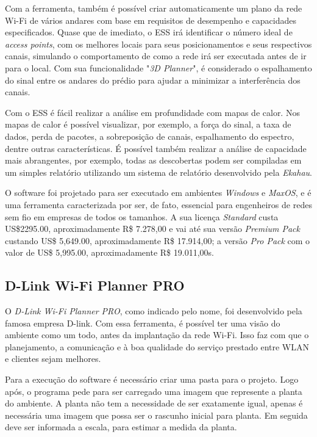 \documentclass[
	12pt,				%
	openright,			%
	twoside,			%
	a4paper,			%
	english,			%
	french,				%
	spanish,			%
	brazil				%
	]{abntex2}
\begin{document}
Com a ferramenta, também é possível criar automaticamente um plano da rede Wi-Fi de vários andares com base em requisitos de desempenho e capacidades especificados. Quase que de imediato, o ESS irá identificar o número ideal de \textit{access points}, com os melhores locais para seus posicionamentos e seus respectivos canais, simulando o comportamento de como a rede irá ser executada antes de ir para o local. Com sua funcionalidade "\textit{3D Planner}", é considerado o espalhamento do sinal entre os andares do prédio para ajudar a minimizar a interferência dos canais.

Com o ESS é fácil realizar a análise em profundidade com mapas de calor. Nos mapas de calor é possível visualizar, por exemplo, a força do sinal, a taxa de dados, perda de pacotes, a sobreposição de canais, espalhamento do espectro, dentre outras características. É possível também realizar a análise de capacidade mais abrangentes, por exemplo, todas as descobertas podem ser compiladas em um simples relatório utilizando um sistema de relatório desenvolvido pela \textit{Ekahau}. 

O software foi projetado para ser executado em ambientes \textit{Windows} e \textit{MaxOS}, e é uma ferramenta caracterizada por ser, de fato, essencial para engenheiros de redes sem fio em empresas de todos os tamanhos. A sua licença \textit{Standard} custa US\$2295.00, aproximadamente R\$ 7.278,00 e vai até sua versão \textit{Premium Pack} custando US\$ 5,649.00, aproximadamente R\$ 17.914,00; a versão \textit{Pro Pack} com o valor de US\$ 5,995.00, aproximadamente R\$ 19.011,00s.


\subsection[D-Link Wi-Fi Planner PRO]{D-Link Wi-Fi Planner PRO}

O \textit{D-Link Wi-Fi Planner PRO}, como indicado pelo nome, foi desenvolvido pela famosa empresa D-link. Com essa ferramenta, é possível ter uma visão do ambiente como um todo, antes da implantação da rede Wi-Fi. Isso faz com que o planejamento, a comunicação e à boa qualidade do serviço prestado entre WLAN e clientes sejam melhores.

Para a execução do software é necessário criar uma pasta para o projeto. Logo após, o programa pede para ser carregado uma imagem que represente a planta do ambiente. A planta não tem a necessidade de ser exatamente igual, apenas é necessária uma imagem que possa ser o rascunho inicial para planta. Em seguida deve ser informada a escala, para estimar a medida da planta.
\end{document}
